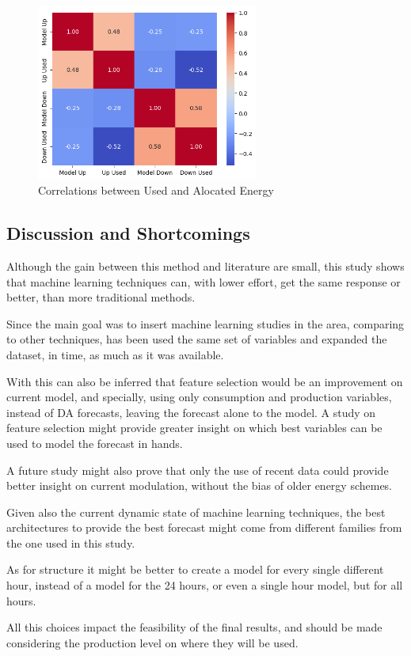 \begin{figure}[H]
    \centering
    \includegraphics[width=0.65\textwidth]{plots/heatmap_correlation_pred.png}
    \caption{Correlations between Used and Alocated Energy}
    \label{fig:mode_pred_corres}
  \end{figure}

\par

\subsection{Discussion and Shortcomings}


{Although the gain between this method and literature \cite{Algarvio2024} are small, this study shows that machine learning techniques can, with lower effort, get the same response or better, than more traditional methods.} \par
{Since the main goal was to insert machine learning studies in the area, comparing to other techniques, has been used the same set of variables and expanded the dataset, in time, as much as it was available.} \par
{With this can also be inferred that feature selection would be an improvement on current model, and specially, using only consumption and production variables, instead of DA forecasts, leaving the forecast alone to the model. A study on feature selection might provide greater insight on which best variables can be used to model the forecast in hands.} \par
{A future study might also prove that only the use of recent data could provide better insight on current modulation, without the bias of older energy schemes.} \par
{Given also the current dynamic state of machine learning techniques, the best architectures to provide the best forecast might come from different families from the one used in this study.} \par
{As for structure it might be better to create a model for every single different hour, instead of a model for the 24 hours, or even a single hour model, but for all hours.} \par
{All this choices impact the feasibility of the final results, and should be made considering the production level on where they will be used.} \par


